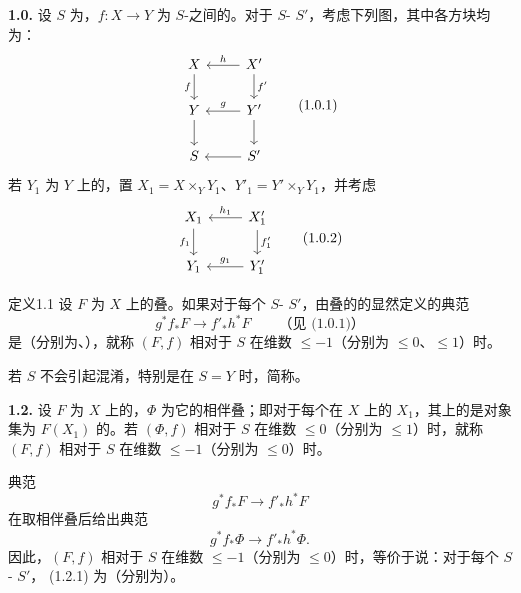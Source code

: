 \textbf{1.0.} 设 $S$ 为，$f:X\to Y$ 为 $S$-之间的。对于 $S$- $S'$，考虑下列图，其中各方块均为：
\[
\begin{tikzcd}
X\arrow[d,"f"']&X'\arrow[l,"h"']\arrow[d,"f'"]\\
Y\arrow[d]&Y'\arrow[l,"g"']\arrow[d]\\
S&S'\arrow[l]
\end{tikzcd}\tag{1.0.1}
\]
若 $Y_1$ 为 $Y$ 上的，置 $X_1=X\times_Y Y_1$、$Y'_1=Y'\times_Y Y_1$，并考虑
\[
\begin{tikzcd}
X_1\arrow[d,"f_1"']&X'_1\arrow[l,"h_1"']\arrow[d,"f'_1"]\\
Y_1&Y'_1\arrow[l,"g_1"']
\end{tikzcd}\tag{1.0.2}
\]
\begin{SGAresult}{定义}{1.1}
设 $F$ 为 $X$ 上的叠。如果对于每个 $S$- $S'$，由叠的的显然定义的典范
\[
g^*f_*F\longrightarrow f'_*h^*F\qquad\text{（见 (1.0.1)）}
\]
是（分别为、），就称 $(F,f)$ 相对于 $S$ 在维数 $\leqslant-1$（分别为 $\leqslant0$、$\leqslant1$）时。
\end{SGAresult}
若 $S$ 不会引起混淆，特别是在 $S=Y$ 时，简称。

\textbf{1.2.} 设 $F$ 为 $X$ 上的，$\Phi$ 为它的相伴叠；即对于每个在 $X$ 上的 $X_1$，其上的是对象集为 $F(X_1)$ 的。若 $(\Phi,f)$ 相对于 $S$ 在维数 $\leqslant0$（分别为 $\leqslant1$）时，就称 $(F,f)$ 相对于 $S$ 在维数 $\leqslant-1$（分别为 $\leqslant0$）时。

典范
\[g^*f_*F\longrightarrow f'_*h^*F\tag{1.2.1}\]
在取相伴叠后给出典范
\[g^*f_*\Phi\longrightarrow f'_*h^*\Phi.\]
因此，$(F,f)$ 相对于 $S$ 在维数 $\leqslant-1$（分别为 $\leqslant0$）时，等价于说：对于每个 $S$- $S'$， (1.2.1) 为（分别为）。

